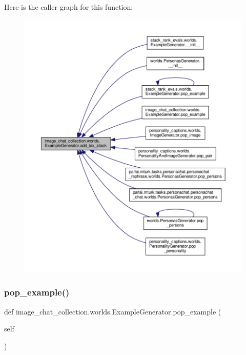 Here is the caller graph for this function\+:
\nopagebreak
\begin{figure}[H]
\begin{center}
\leavevmode
\includegraphics[width=350pt]{classimage__chat__collection_1_1worlds_1_1ExampleGenerator_aa2cc3ca44d92a3aa6a75cb4a4194f4dd_icgraph}
\end{center}
\end{figure}
\mbox{\label{classimage__chat__collection_1_1worlds_1_1ExampleGenerator_a483f70c4d3d3643b180f4a37b204f586}} 
\subsubsection{\texorpdfstring{pop\+\_\+example()}{pop\_example()}}
{\footnotesize\ttfamily def image\+\_\+chat\+\_\+collection.\+worlds.\+Example\+Generator.\+pop\+\_\+example (\begin{DoxyParamCaption}\item[{}]{self }\end{DoxyParamCaption})}



